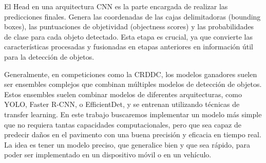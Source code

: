 El Head en una arquitectura CNN es la parte encargada de realizar las predicciones finales. Genera las coordenadas de las cajas delimitadoras (bounding boxes), las puntuaciones de objetividad (objectness scores) y las probabilidades de clase para cada objeto detectado. Esta etapa es crucial, ya que convierte las características procesadas y fusionadas en etapas anteriores en información útil para la detección de objetos.







Generalmente, en competiciones como la CRDDC, los modelos ganadores suelen ser ensembles complejos que combinan múltiples modelos de detección de objetos. Estos ensembles suelen combinar modelos de diferentes arquitecturas, como YOLO, Faster R-CNN, o EfficientDet, y se entrenan utilizando técnicas de transfer learning. En este trabajo buscaremos implementar un modelo más simple que no requiera tantas capacidades computacionales, pero que sea capaz de predecir daños en el pavimento con una buena precisión y eficacia en tiempo real. La idea es tener un modelo preciso, que generalice bien y que sea rápido, para poder ser implementado en un dispositivo móvil o en un vehículo.
